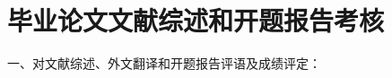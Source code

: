 \let\cleardoublepage\clearpage
\pagestyle{empty}
\setcounter{page}{1}


{
    \chapter*{毕业论文文献综述和开题报告考核}
    \thispagestyle{empty}

    \bfseries

    {
        \noindent 一、对文献综述、外文翻译和开题报告评语及成绩评定：
    }


    \vspace{150mm}
    \designproposaleval[~~~~~~~~~~~~~~~~~~][~~~~~~~~~~~~~~~~~~][~~~~~~~~~~~~~~~~~~]
    \signature{开题报告答辩小组负责人（签名）}
}
